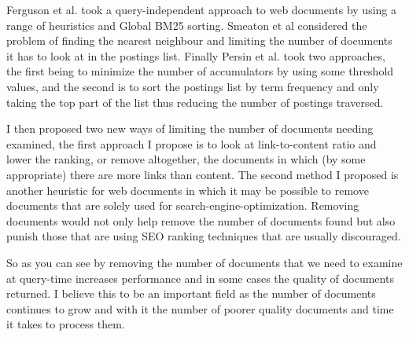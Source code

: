 \documentclass{acm_proc_article-sp}
\begin{document}
Ferguson et al. took a query-independent approach to web documents by using a range of heuristics and Global BM25 sorting. Smeaton et al considered the problem of finding the nearest neighbour and limiting the number of documents it has to look at in the postings list. Finally Persin et al. took two approaches, the first being to minimize the number of accumulators by using some threshold values, and the second is to sort the postings list by term frequency and only taking the top part of the list thus reducing the number of postings traversed. 

I then proposed two new ways of limiting the number of documents needing examined, the first approach I propose is to look at link-to-content ratio and lower the ranking, or remove altogether, the documents in which (by some appropriate) there are more links than content. The second method I proposed is another heuristic for web documents in which it may be possible to remove documents that are solely used for search-engine-optimization. Removing documents would not only help remove the number of documents found but also punish those that are using SEO ranking techniques that are usually discouraged.

So as you can see by removing the number of documents that we need to examine at query-time increases performance and in some cases the quality of documents returned. I believe this to be an important field as the number of documents continues to grow and with it the number of poorer quality documents and time it takes to process them.


 

\balancecolumns
\end{document}
